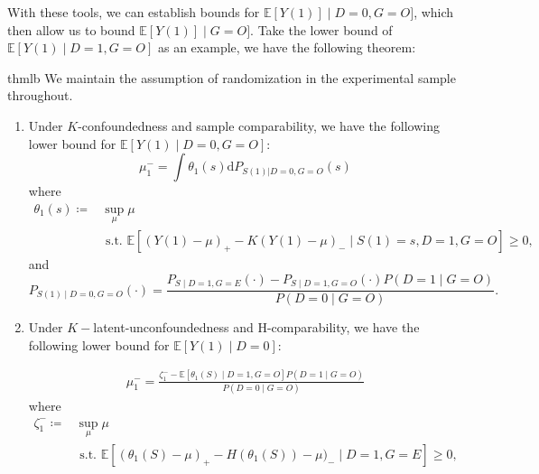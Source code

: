 \documentclass[12pt]{article}
\newcommand{\Ep}{\mathbb{E}}
\begin{document}
	With these tools, we can establish bounds for $\Ep[Y(1)] \mid D = 0, G = O]$, which then allow us to bound $\Ep[Y(1)] \mid G = O]$. Take the lower bound of $\Ep[Y(1) \mid D= 1, G = O]$ as an example, we have the following theorem:
	\begin{restatable}[Lower Bound on $\Ep(Y(1) \mid D = 0, G = O)$]{thm}{lb}\label{thm:thm2}
		We maintain the assumption of randomization  in the experimental sample throughout.
		\begin{enumerate}[label=(\alph*)]
			\item Under $K$-confoundedness and sample comparability, we have the following lower bound for $\Ep[Y(1) \mid D = 0, G = O]$:
			$$\mu^-_1 = \int \theta_1(s) \mathrm{d} P_{S(1) | D = 0, G = O}(s)$$ where 
			\begin{equation}\label{eq:eq1}
			\begin{array}{ll}
			\theta_1(s) \coloneqq & \sup _{\mu}  \mu \\
			& \text { s.t. }  \mathbb{E}\left[(Y(1)-\mu)_{+}-K(Y(1)-\mu)_{-} \mid S(1)=s, D=1, G = O\right] \geq 0,
			\end{array}
			\end{equation}
			and 
			\begin{equation}\label{eq:eq2}
			P_{S(1) \mid D = 0, G = O} (\cdot) = \frac{P_{S \mid D = 1, G = E}(\cdot) - P_{S \mid D = 1, G = O} (\cdot) P(D = 1 \mid G = O) }{P(D = 0 \mid G = O)}.    
			\end{equation}
			
			
			\item Under $K-$latent-unconfoundedness and H-comparability, we have the following lower bound for $\Ep[Y(1) \mid D = 0]$:
			
			\begin{equation}\label{eq:eq3}
			\begin{array}{ll}
			\mu_1^- =  \frac{\zeta_1^- - \Ep[\theta_1(S) \mid D=1, G=O] P(D=1\mid G=O)}{P(D = 0 \mid G = O)}
			\end{array}
			\end{equation}
			where 
			\begin{equation}\label{eq:eq4}
			\begin{array}{ll}
			\zeta_1^- \coloneqq & \sup _{\mu}  \mu \\
			& \text { s.t. }  \mathbb{E}\left[(\theta_1(S)-\mu)_{+}-H(\theta_1(S))-\mu)_{-} \mid D=1, G = E\right] \geq 0,
			\end{array}
			\end{equation}
			
		\end{enumerate}
	\end{restatable}
	
\end{document}
